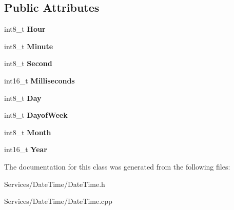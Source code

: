 \subsection*{Public Attributes}
\begin{DoxyCompactItemize}
\item 
\hypertarget{class_date_time_ab306c0dd7931822b39ae58be72cebae0}{}int8\+\_\+t {\bfseries Hour}\label{class_date_time_ab306c0dd7931822b39ae58be72cebae0}

\item 
\hypertarget{class_date_time_a2281ee834b6d9be9fa4c7bc4046394c3}{}int8\+\_\+t {\bfseries Minute}\label{class_date_time_a2281ee834b6d9be9fa4c7bc4046394c3}

\item 
\hypertarget{class_date_time_a05d8e4467eb9841035b31237f3d76a58}{}int8\+\_\+t {\bfseries Second}\label{class_date_time_a05d8e4467eb9841035b31237f3d76a58}

\item 
\hypertarget{class_date_time_a52885b8a894ba0dddabc80bddad467fd}{}int16\+\_\+t {\bfseries Milliseconds}\label{class_date_time_a52885b8a894ba0dddabc80bddad467fd}

\item 
\hypertarget{class_date_time_a8f3d535c712aaa1d8b5cc088ea3c10ff}{}int8\+\_\+t {\bfseries Day}\label{class_date_time_a8f3d535c712aaa1d8b5cc088ea3c10ff}

\item 
\hypertarget{class_date_time_a9a3d78a0f8a1cdbf7df9a026ddea4ee4}{}int8\+\_\+t {\bfseries Dayof\+Week}\label{class_date_time_a9a3d78a0f8a1cdbf7df9a026ddea4ee4}

\item 
\hypertarget{class_date_time_ac2948899151acbee8819a19ad35fd511}{}int8\+\_\+t {\bfseries Month}\label{class_date_time_ac2948899151acbee8819a19ad35fd511}

\item 
\hypertarget{class_date_time_a4d2fdc35a2cc020b1b24ff87d5bf2aeb}{}int16\+\_\+t {\bfseries Year}\label{class_date_time_a4d2fdc35a2cc020b1b24ff87d5bf2aeb}

\end{DoxyCompactItemize}


The documentation for this class was generated from the following files\+:\begin{DoxyCompactItemize}
\item 
Services/\+Date\+Time/Date\+Time.\+h\item 
Services/\+Date\+Time/Date\+Time.\+cpp\end{DoxyCompactItemize}
